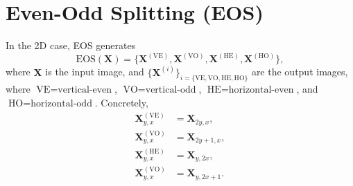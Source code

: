 \documentclass{article}
\begin{document}

\section{Even-Odd Splitting (EOS)}
\label{ape:EOS}

In the 2D case, EOS generates
\begin{equation}
  \mathrm{EOS}(\mathbf{X})=\{\mathbf{X}^{(\text{VE})}, \mathbf{X}^{(\text{VO})}, \mathbf{X}^{(\text{HE})}, \mathbf{X}^{(\text{HO})}\},
\end{equation}
where $\mathbf{X}$ is the input image, and $\{\mathbf{X}^{(i)}\}_{i=\{\text{VE}, \text{VO}, \text{HE}, \text{HO}\}}$
  are the output images, where $\text{VE}=\text{vertical-even}$,
  $\text{VO}=\text{vertical-odd}$, $\text{HE}=\text{horizontal-even}$,
  and $\text{HO}=\text{horizontal-odd}$. Concretely,
  \begin{align}
    \mathbf{X}^{(\text{VE})}_{y,x} & = \mathbf{X}_{2y,x}, \\
    \mathbf{X}^{(\text{VO})}_{y,x} & = \mathbf{X}_{2y+1,x}, \\
    \mathbf{X}^{(\text{HE})}_{y,x} & = \mathbf{X}_{y,2x},\\
    \mathbf{X}^{(\text{VO})}_{y,x} & = \mathbf{X}_{y,2x+1}.
  \end{align}
  
\end{document}
